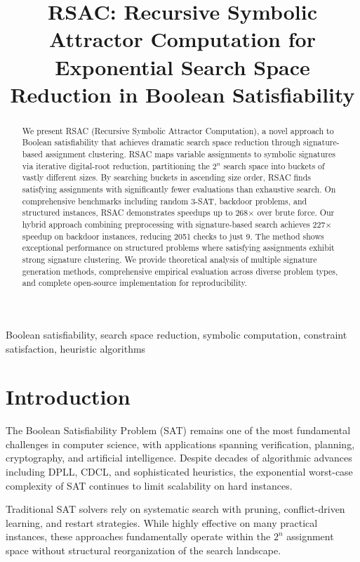 \documentclass[conference]{IEEEtran}
\title{RSAC: Recursive Symbolic Attractor Computation for Exponential Search Space Reduction in Boolean Satisfiability}
\author{
\IEEEauthorblockN{Gregory Betti}
\IEEEauthorblockA{Betti Labs\\
Email: gregory@betti-labs.com}
}
\begin{document}
\maketitle

\begin{abstract}
We present RSAC (Recursive Symbolic Attractor Computation), a novel approach to Boolean satisfiability that achieves dramatic search space reduction through signature-based assignment clustering. RSAC maps variable assignments to symbolic signatures via iterative digital-root reduction, partitioning the $2^n$ search space into buckets of vastly different sizes. By searching buckets in ascending size order, RSAC finds satisfying assignments with significantly fewer evaluations than exhaustive search. On comprehensive benchmarks including random 3-SAT, backdoor problems, and structured instances, RSAC demonstrates speedups up to 268$\times$ over brute force. Our hybrid approach combining preprocessing with signature-based search achieves 227$\times$ speedup on backdoor instances, reducing 2051 checks to just 9. The method shows exceptional performance on structured problems where satisfying assignments exhibit strong signature clustering. We provide theoretical analysis of multiple signature generation methods, comprehensive empirical evaluation across diverse problem types, and complete open-source implementation for reproducibility.
\end{abstract}

\begin{IEEEkeywords}
Boolean satisfiability, search space reduction, symbolic computation, constraint satisfaction, heuristic algorithms
\end{IEEEkeywords}

\section{Introduction}

The Boolean Satisfiability Problem (SAT) remains one of the most fundamental challenges in computer science, with applications spanning verification, planning, cryptography, and artificial intelligence. Despite decades of algorithmic advances including DPLL, CDCL, and sophisticated heuristics, the exponential worst-case complexity of SAT continues to limit scalability on hard instances.

Traditional SAT solvers rely on systematic search with pruning, conflict-driven learning, and restart strategies. While highly effective on many practical instances, these approaches fundamentally operate within the $2^n$ assignment space without structural reorganization of the search landscape.
\end{document}
